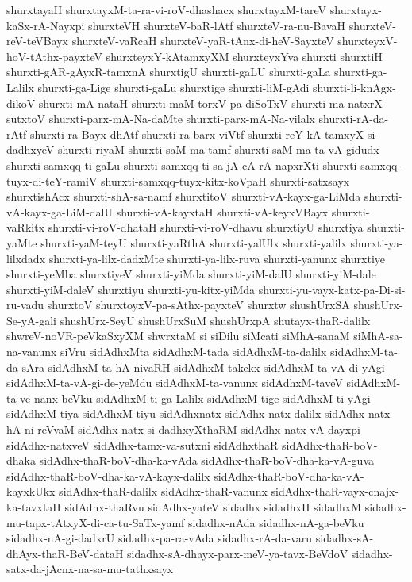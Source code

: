 {shurxtayaH
shurxtayxM-ta-ra-vi-roV-dhashacx
shurxtayxM-tareV
shurxtayx-kaSx-rA-Nayxpi
shurxteVH
shurxteV-baR-lAtf
shurxteV-ra-nu-BavaH
shurxteV-reV-teVBayx
shurxteV-vaRcaH
shurxteV-yaR-tAnx-di-heV-SayxteV
shurxteyxV-hoV-tAthx-payxteV
shurxteyxY-kAtamxyXM
shurxteyxYva
shurxti
shurxtiH
shurxti-gAR-gAyxR-tamxnA
shurxtigU
shurxti-gaLU
shurxti-gaLa
shurxti-ga-Lalilx
shurxti-ga-Lige
shurxti-gaLu
shurxtige
shurxti-liM-gAdi
shurxti-li-knAgx-dikoV
shurxti-mA-nataH
shurxti-maM-torxV-pa-diSoTxV
shurxti-ma-natxrX-sutxtoV
shurxti-parx-mA-Na-daMte
shurxti-parx-mA-Na-vilalx
shurxti-rA-da-rAtf
shurxti-ra-Bayx-dhAtf
shurxti-ra-barx-viVtf
shurxti-reY-kA-tamxyX-si-dadhxyeV
shurxti-riyaM
shurxti-saM-ma-tamf
shurxti-saM-ma-ta-vA-gidudx
shurxti-samxqq-ti-gaLu
shurxti-samxqq-ti-sa-jA-cA-rA-napxrXti
shurxti-samxqq-tuyx-di-teY-ramiV
shurxti-samxqq-tuyx-kitx-koVpaH
shurxti-satxsayx
shurxtishAcx
shurxti-shA-sa-namf
shurxtitoV
shurxti-vA-kayx-ga-LiMda
shurxti-vA-kayx-ga-LiM-dalU
shurxti-vA-kayxtaH
shurxti-vA-keyxVBayx
shurxti-vaRkitx
shurxti-vi-roV-dhataH
shurxti-vi-roV-dhavu
shurxtiyU
shurxtiya
shurxti-yaMte
shurxti-yaM-teyU
shurxti-yaRthA
shurxti-yalUlx
shurxti-yalilx
shurxti-ya-lilxdadx
shurxti-ya-lilx-dadxMte
shurxti-ya-lilx-ruva
shurxti-yanunx
shurxtiye
shurxti-yeMba
shurxtiyeV
shurxti-yiMda
shurxti-yiM-dalU
shurxti-yiM-dale
shurxti-yiM-daleV
shurxtiyu
shurxti-yu-kitx-yiMda
shurxti-yu-vayx-katx-pa-Di-si-ru-vadu
shurxtoV
shurxtoyxV-pa-sAthx-payxteV
shurxtw
shushUrxSA
shushUrx-Se-yA-gali
shushUrx-SeyU
shushUrxSuM
shushUrxpA
shutayx-thaR-dalilx
shwreV-noVR-peVkaSxyXM
shwrxtaM
si
siDilu
siMcati
siMhA-sanaM
siMhA-sa-na-vanunx
siVru
sidAdhxMta
sidAdhxM-tada
sidAdhxM-ta-dalilx
sidAdhxM-ta-da-sAra
sidAdhxM-ta-hA-nivaRH
sidAdhxM-takekx
sidAdhxM-ta-vA-di-yAgi
sidAdhxM-ta-vA-gi-de-yeMdu
sidAdhxM-ta-vanunx
sidAdhxM-taveV
sidAdhxM-ta-ve-nanx-beVku
sidAdhxM-ti-ga-Lalilx
sidAdhxM-tige
sidAdhxM-ti-yAgi
sidAdhxM-tiya
sidAdhxM-tiyu
sidAdhxnatx
sidAdhx-natx-dalilx
sidAdhx-natx-hA-ni-reVvaM
sidAdhx-natx-si-dadhxyXthaRM
sidAdhx-natx-vA-dayxpi
sidAdhx-natxveV
sidAdhx-tamx-va-sutxni
sidAdhxthaR
sidAdhx-thaR-boV-dhaka
sidAdhx-thaR-boV-dha-ka-vAda
sidAdhx-thaR-boV-dha-ka-vA-guva
sidAdhx-thaR-boV-dha-ka-vA-kayx-dalilx
sidAdhx-thaR-boV-dha-ka-vA-kayxkUkx
sidAdhx-thaR-dalilx
sidAdhx-thaR-vanunx
sidAdhx-thaR-vayx-cnajx-ka-tavxtaH
sidAdhx-thaRvu
sidAdhx-yateV
sidadhx
sidadhxH
sidadhxM
sidadhx-mu-tapx-tAtxyX-di-ca-tu-SaTx-yamf
sidadhx-nAda
sidadhx-nA-ga-beVku
sidadhx-nA-gi-dadxrU
sidadhx-pa-ra-vAda
sidadhx-rA-da-varu
sidadhx-sA-dhAyx-thaR-BeV-dataH
sidadhx-sA-dhayx-parx-meV-ya-tavx-BeVdoV
sidadhx-satx-da-jAcnx-na-sa-mu-tathxsayx
}
